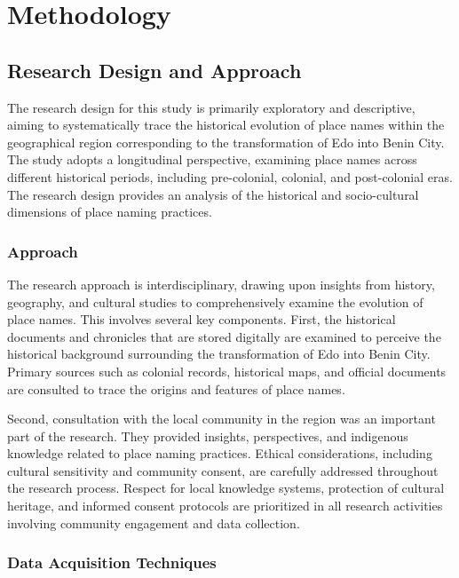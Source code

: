 \chapter{Methodology}

\section{Research Design and Approach}

The research design for this study is primarily exploratory and descriptive, aiming to systematically trace the historical evolution of place names within the geographical region corresponding to the transformation of Edo into Benin City. The study adopts a longitudinal perspective, examining place names across different historical periods, including pre-colonial, colonial, and post-colonial eras. The research design provides an analysis of the historical and socio-cultural dimensions of place naming practices.

\subsection{Approach}

The research approach is interdisciplinary, drawing upon insights from history, geography, and cultural studies to comprehensively examine the evolution of place names. This involves several key components. First, the historical documents and chronicles that are stored digitally are examined to perceive the historical background surrounding the transformation of Edo into Benin City. Primary sources such as colonial records, historical maps, and official documents are consulted to trace the origins and features of place names.

Second, consultation with the local community in the region was an important part of the research. They provided insights, perspectives, and indigenous knowledge related to place naming practices. Ethical considerations, including cultural sensitivity and community consent, are carefully addressed throughout the research process. Respect for local knowledge systems, protection of cultural heritage, and informed consent protocols are prioritized in all research activities involving community engagement and data collection.


\subsection{Data Acquisition Techniques}

